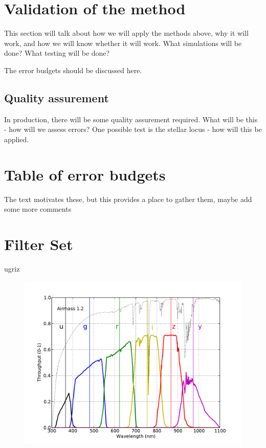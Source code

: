 \documentclass[12pt,preprint]{aastex}
\begin{document}
\section{Validation of the method}

This section will talk about how we will apply the methods above, why
it will work, and how we will know whether it will work. What
simulations will be done? What testing
will be done? 

The error budgets should be discussed here. 

\subsection{Quality assurement}
In production, there will be some quality assurement required. What
will be this - how will we assess errors? 
One possible test is the stellar locus - how will this be applied.


\appendix


\section{Table of error budgets}

The text motivates these, but this provides a place to
gather them, maybe add some more comments


\section{Filter Set}
ugriz
\begin{figure}[ht]
\includegraphics[width=5in]{filters}
\end{figure}
\end{document}
